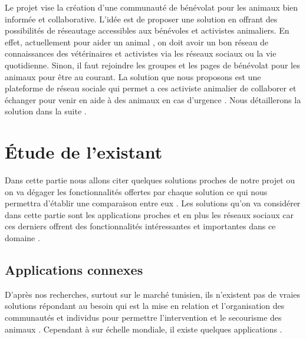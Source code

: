 \documentclass[11pt,a4paper,oneside]{book}
\begin{document}
	Le projet vise la création d’une communauté de bénévolat pour les animaux bien informée et collaborative. L’idée est de proposer une solution en offrant des possibilités de réseautage accessibles aux  bénévoles et activistes animaliers. En effet, actuellement pour aider un animal , on doit avoir un bon réseau de connaissances des vétérinaires et activistes via les réseaux sociaux ou la vie quotidienne. Sinon, il faut rejoindre les groupes et les pages de bénévolat pour les animaux pour être au courant. La solution que nous proposons est une plateforme de réseau sociale qui permet a ces activiste animalier de collaborer et échanger pour venir en aide à des animaux en cas d’urgence . Nous détaillerons la solution dans la suite .
	
	\section{Étude de l’existant}
	Dans cette partie nous allons citer quelques solutions proches de notre projet ou on va dégager les fonctionnalités offertes par chaque solution ce qui nous permettra d'établir une comparaison entre eux .
	Les solutions qu'on va considérer dans cette partie sont les applications proches et en plus les réseaux sociaux car ces derniers offrent des fonctionnalités intéressantes et importantes dans ce domaine .
	\subsection{Applications connexes}
	D’après nos recherches, surtout sur le marché tunisien, ils n’existent pas de vraies solutions répondant au besoin qui est la mise en relation et l’organisation des communautés et individus pour permettre l’intervention et le secourisme des animaux . Cependant à sur échelle mondiale, il existe quelques applications .
\end{document}
